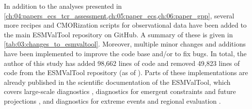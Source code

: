 In addition to the analyses presented in
\cref{ch:04:papers_ecs_tcr_assessment,ch:05:paper_ecs,ch:06:paper_gpp}, several
more recipes and \acs{CMOR}ization scripts for observational data have been
added to the main \ac{ESMValTool} repository on GitHub. A summary of these is
given in \cref{tab:03:changes_to_esmvaltool}. Moreover, multiple minor changes
and additions have been implemented to improve the code base and/or to fix
bugs. In total, the author of this study has added 98,662 lines of code and
removed 49,823 lines of code from the \ac{ESMValTool} repository (as of
\TheMonth{}). Parts of these implementations are already published in the
scientific documentation of the \ac{ESMValTool}, which covers large-scale
diagnostics \autocite{Eyring2020}, diagnostics for emergent constraints and
future projections \autocite{Lauer2020}, and diagnostics for extreme events and
regional evaluation \autocite{Weigel2020}.

